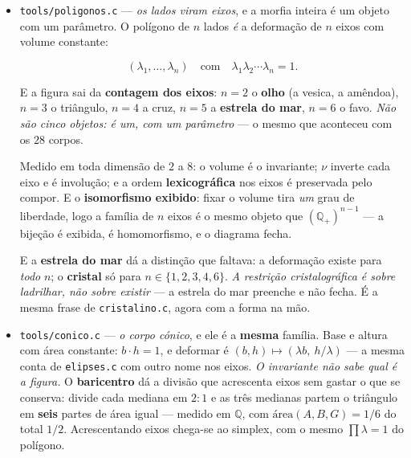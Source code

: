 \documentclass[11pt]{article}
\newcommand{\code}[1]{\texttt{\small #1}}
\newcommand{\Q}{\mathbb Q}
\theoremstyle{plain}
\theoremstyle{remark}
\begin{document}
\begin{itemize}
\[ (\lambda,\ 1/\lambda) \quad\text{com}\quad a\cdot b = 1, \qquad D(\lambda) = \mathrm{diag}(\lambda, 1/\lambda),\ \det = 1. \]

Medido: a área é o \textbf{invariante} --- $a\cdot b = 1$ para todo $\lambda$ racional, exato;
\textbf{compor} multiplica os $\lambda$; o \textbf{dual} $\nu(\lambda) = 1/\lambda$ troca os eixos,
é involução e respeita o compor; e o \textbf{círculo} $\lambda = 1$ é o \emph{único} autodual da
família --- o rotor outra vez, pela terceira porta. E o essencial: \textbf{os $\lambda$ ordenam-se,
e a ordem é preservada pelo compor} --- é ordem \emph{compatível}, e não uma que se imponha de
fora: é a elongação, o parâmetro da própria deformação.

\emph{Então as elipses ordenam-se pela sua própria construção}, e nada disso dependia de haver ou
não ordem em $\Q(i)$. A régua elíptica dá o \textbf{raio} (\code{vesica.c}); a elongação dá a
\textbf{ordem}. Duas coordenadas, e nenhuma precisava de ser recusada.
\item \code{tools/poligonos.c} --- \emph{os lados viram eixos}, e a morfia inteira é um objeto
com um parâmetro. O polígono de $n$ lados \emph{é} a deformação de $n$ eixos com volume constante:

\[ (\lambda_1,\dots,\lambda_n) \quad\text{com}\quad \lambda_1\lambda_2\cdots\lambda_n = 1. \]

E a figura sai da \textbf{contagem dos eixos}: $n=2$ o \textbf{olho} (a vesica, a amêndoa), $n=3$ o
triângulo, $n=4$ a cruz, $n=5$ a \textbf{estrela do mar}, $n=6$ o favo. \emph{Não são cinco
objetos: é um, com um parâmetro} --- o mesmo que aconteceu com os $28$ corpos.

Medido em toda dimensão de $2$ a $8$: o volume é o invariante; $\nu$ inverte cada eixo e é
involução; e a ordem \textbf{lexicográfica} nos eixos é preservada pelo compor. E o
\textbf{isomorfismo exibido}: fixar o volume tira \emph{um} grau de liberdade, logo a família de
$n$ eixos é o mesmo objeto que $(\Q_+)^{n-1}$ --- a bijeção é exibida, é homomorfismo, e o diagrama
fecha.

E a \textbf{estrela do mar} dá a distinção que faltava: a deformação existe para \emph{todo} $n$;
o \textbf{cristal} só para $n \in \{1,2,3,4,6\}$. \emph{A restrição cristalográfica é sobre
ladrilhar, não sobre existir} --- a estrela do mar preenche e não fecha. É a mesma frase de
\code{cristalino.c}, agora com a forma na mão.
\item \code{tools/conico.c} --- \emph{o corpo cónico}, e ele é a \textbf{mesma} família. Base
e altura com área constante: $b\cdot h = 1$, e deformar é $(b,h) \mapsto (\lambda b,\ h/\lambda)$ ---
a mesma conta de \code{elipses.c} com outro nome nos eixos. \emph{O invariante não sabe qual é a
figura.} O \textbf{baricentro} dá a divisão que acrescenta eixos sem gastar o que se conserva:
divide cada mediana em $2{:}1$ e as três medianas partem o triângulo em \textbf{seis} partes de
área igual --- medido em $\Q$, com $\mathrm{área}(A,B,G) = 1/6$ do total $1/2$. Acrescentando eixos
chega-se ao simplex, com o mesmo $\prod\lambda = 1$ do polígono.


\end{itemize}
\end{document}
